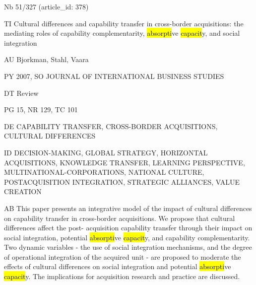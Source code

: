 \documentclass[a4paper]{article}
\begin{document}
\vspace*{-2cm}
Nb \tabto{0cm}51/327 (article\_id: 378)\par
TI \tabto{0cm}Cultural differences and capability transfer in cross-border acquisitions: the mediating roles of capability complementarity, \hl{absorpti}ve \hl{capacit}y, and social integration\par
AU \tabto{0cm}Bjorkman, Stahl, Vaara\par
PY \tabto{0cm}2007, SO JOURNAL OF INTERNATIONAL BUSINESS STUDIES\par
DT \tabto{0cm}Review\par
PG \tabto{0cm}15, NR 129, TC 101\par
DE \tabto{0cm}CAPABILITY TRANSFER, CROSS-BORDER ACQUISITIONS, CULTURAL DIFFERENCES\par
ID \tabto{0cm}DECISION-MAKING, GLOBAL STRATEGY, HORIZONTAL ACQUISITIONS, KNOWLEDGE TRANSFER, LEARNING PERSPECTIVE, MULTINATIONAL-CORPORATIONS, NATIONAL CULTURE, POSTACQUISITION INTEGRATION, STRATEGIC ALLIANCES, VALUE CREATION\par
AB \tabto{0cm}This paper presents an integrative model of the impact of cultural differences on capability transfer in cross-border acquisitions. We propose that cultural differences affect the post- acquisition capability transfer through their impact on social integration, potential \hl{absorpti}ve \hl{capacit}y, and capability complementarity. Two dynamic variables - the use of social integration mechanisms, and the degree of operational integration of the acquired unit - are proposed to moderate the effects of cultural differences on social integration and potential \hl{absorpti}ve \hl{capacit}y. The implications for acquisition research and practice are discussed.\par
\clearpage
\end{document}
